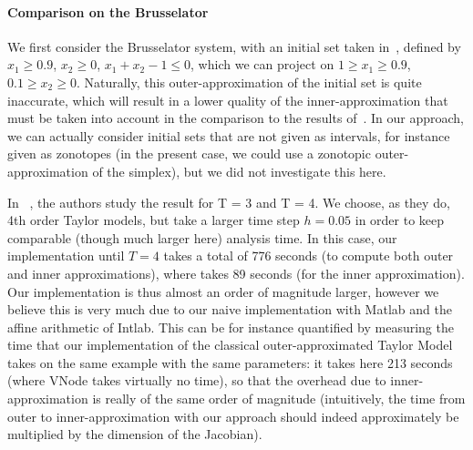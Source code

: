 \paragraph{Comparison on the Brusselator}
We first consider the Brusselator system, with an initial set taken in~\cite{Underapproxflowpipes}, defined by 
$x_1 \geq 0.9$, $x_2 \geq 0$, $x_1+x_2-1 \leq 0$, which we can project on $1 \geq x_1 \geq 0.9$, $0.1 \geq x_2 \geq 0$.
Naturally, this outer-approximation of the initial set is quite inaccurate, which will result in a lower quality of the inner-approximation
that must be taken into account in the comparison to the results of~\cite{Underapproxflowpipes}. In our approach, 
we can actually consider initial sets that are not given as intervals, for instance given as zonotopes 
(in the present case, we could use a zonotopic outer-approximation of the simplex),  
but we did not investigate this here. 

In ~\cite{Underapproxflowpipes}, the authors study the result for T = 3 and T = 4. We choose, as they do, 4th order Taylor models, 
but take a larger time step $h=0.05$ in order to keep comparable (though much larger here) analysis time. In this case, our implementation until $T=4$
takes a total of 776 seconds (to compute both outer and inner approximations), where \cite{Underapproxflowpipes} takes 89 seconds (for the inner approximation).
Our implementation is thus almost an order of magnitude larger, however we believe this is very much due to our naive implementation 
with Matlab and the affine arithmetic of Intlab. This can be for instance quantified by measuring the time  that our implementation of the classical 
outer-approximated Taylor Model takes on the same example with the same parameters: it takes here 213 seconds (where VNode takes virtually no time), so that the overhead due to inner-approximation 
is really of the same order of magnitude (intuitively, the time from outer to inner-approximation with our approach should indeed approximately 
be multiplied by the dimension of the Jacobian). 

